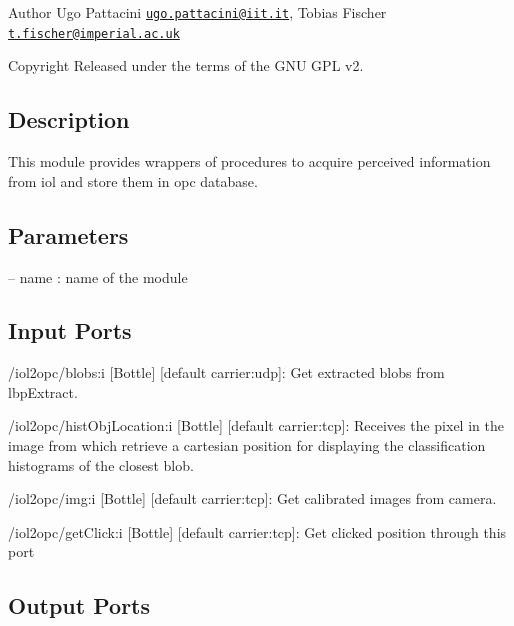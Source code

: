 \begin{DoxyAuthor}{Author}
Ugo Pattacini \href{mailto:ugo.pattacini@iit.it}{\tt ugo.\+pattacini@iit.\+it}, Tobias Fischer \href{mailto:t.fischer@imperial.ac.uk}{\tt t.\+fischer@imperial.\+ac.\+uk} ~\newline
 
\end{DoxyAuthor}
\begin{DoxyCopyright}{Copyright}
Released under the terms of the G\+NU G\+PL v2. 
\end{DoxyCopyright}
\hypertarget{group__touchDetector_intro_sec}{}\subsection{Description}\label{group__touchDetector_intro_sec}
This module provides wrappers of procedures to acquire perceived information from iol and store them in opc database.\hypertarget{group__touchDetector_parameters_sec}{}\subsection{Parameters}\label{group__touchDetector_parameters_sec}

\begin{DoxyItemize}
\item -- name \+: name of the module 
\end{DoxyItemize}\hypertarget{group__touchDetector_inputports_sec}{}\subsection{Input Ports}\label{group__touchDetector_inputports_sec}

\begin{DoxyItemize}
\item /iol2opc/blobs\+:i \mbox{[}Bottle\mbox{]} \mbox{[}default carrier\+:udp\mbox{]}\+: Get extracted blobs from lbp\+Extract.
\item /iol2opc/hist\+Obj\+Location\+:i \mbox{[}Bottle\mbox{]} \mbox{[}default carrier\+:tcp\mbox{]}\+: Receives the pixel in the image from which retrieve a cartesian position for displaying the classification histograms of the closest blob.
\item /iol2opc/img\+:i \mbox{[}Bottle\mbox{]} \mbox{[}default carrier\+:tcp\mbox{]}\+: Get calibrated images from camera.
\item /iol2opc/get\+Click\+:i \mbox{[}Bottle\mbox{]} \mbox{[}default carrier\+:tcp\mbox{]}\+: Get clicked position through this port
\end{DoxyItemize}\hypertarget{group__touchDetector_outputports_sec}{}\subsection{Output Ports}\label{group__touchDetector_outputports_sec}

